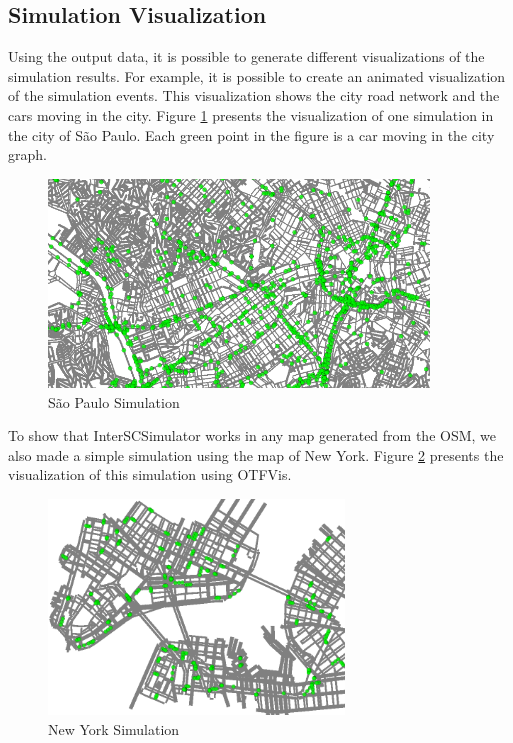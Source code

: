 \subsection{Simulation Visualization}

Using the output data, it is possible to generate different visualizations of the simulation results. For example, it is possible to create an animated visualization of the simulation events. This visualization shows the city road network and the cars moving in the city. Figure \ref{fig:sao_paulo_map} presents the visualization of one simulation in the city of S\~ao Paulo. Each green point in the figure is a car moving in the city graph.

\begin{figure}[!htb]
\centering
\includegraphics[width=0.9\textwidth]{figuras/chap-interscsimulator/mapa.png}
\caption{S\~ao Paulo Simulation}
\label{fig:sao_paulo_map}
\end{figure}

To show that InterSCSimulator works in any map generated from the OSM, we also made a simple simulation using the map of New York. Figure \ref{fig:newYork} presents the visualization of this simulation using OTFVis.

\begin{figure}[!htb]
\centering
\includegraphics[width=0.7\textwidth]{figuras/mapaNy.png}
\caption{New York Simulation}
\label{fig:newYork}
\end{figure}

